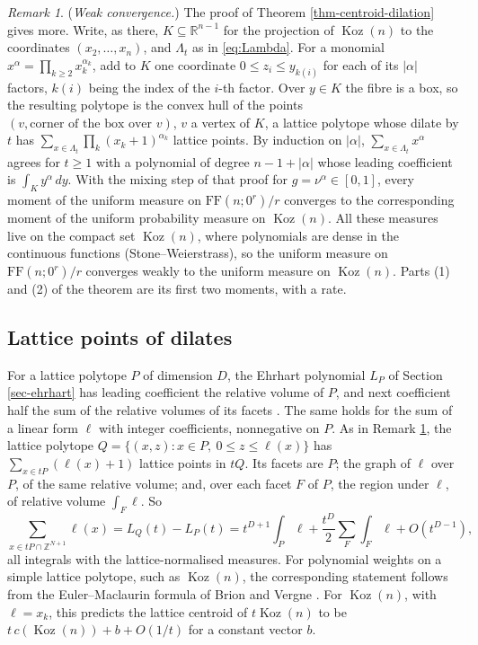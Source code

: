 \documentclass[11pt, a4paper, abstract=yes]{scrartcl}
\theoremstyle{definition}
\theoremstyle{remark}
\newtheorem{remark}[definition]{Remark}
\theoremstyle{plain}
\theoremstyle{remark}
\theoremstyle{plain}
\newcommand{\Koz}{\operatorname{Koz}}
\newcommand{\FF}{\mathrm{FF}}
\begin{document}
\begin{remark}
(\emph{Weak convergence.}) The proof of Theorem \ref{thm-centroid-dilation} gives more. Write, as there,
\(K\subseteq\mathbb R^{n-1}\) for the projection of \(\Koz(n)\) to the coordinates
\((x_2,\dots,x_n)\), and \(\Lambda_t\) as in \eqref{eq:Lambda}. For a monomial
\(x^\alpha=\prod_{k\ge2}x_k^{\alpha_k}\), add to \(K\) one coordinate \(0\le z_i\le y_{k(i)}\) for each of
its \(\lvert\alpha\rvert\) factors, \(k(i)\) being the index of the \(i\)-th factor. Over \(y\in K\) the
fibre is a box, so the resulting polytope is the
convex hull of the points \((v,\text{corner of the box over }v)\), \(v\) a vertex of \(K\), a lattice
polytope whose dilate by \(t\) has \(\sum_{x\in\Lambda_t}\prod_k(x_k+1)^{\alpha_k}\) lattice points. By
induction on \(\lvert\alpha\rvert\), \(\sum_{x\in\Lambda_t}x^\alpha\) agrees for \(t\ge1\) with a polynomial
of degree \(n-1+\lvert\alpha\rvert\) whose leading coefficient is \(\int_Ky^\alpha\,dy\). With the mixing
step of that proof for \(g=\nu^\alpha\in[0,1]\), every moment of the uniform measure on \(\FF(n;0^r)/r\) converges to
the corresponding moment of the uniform probability measure on \(\Koz(n)\). All these measures live on
the compact set \(\Koz(n)\), where polynomials are dense in the continuous functions
(Stone--Weierstrass), so the uniform measure on \(\FF(n;0^r)/r\) converges weakly to the uniform
measure on \(\Koz(n)\). Parts (1) and (2) of the theorem are its first two moments, with a rate.
\label{rem-weak-convergence}
\end{remark}
\subsection{Lattice points of dilates}
\label{sec:org4739b5f}

For a lattice polytope \(P\) of dimension \(D\), the Ehrhart polynomial \(L_P\) of
Section \ref{sec-ehrhart} has leading coefficient the relative volume of \(P\), and next coefficient
half the sum of the relative volumes of its facets \autocite[Theorem 5.6]{BeckRobins2015}. The same
holds for the sum of a linear form \(\ell\) with integer coefficients, nonnegative on \(P\). As in
Remark \ref{rem-weak-convergence}, the lattice polytope \(Q=\{(x,z):x\in P,\ 0\le z\le\ell(x)\}\) has
\(\sum_{x\in tP}(\ell(x)+1)\) lattice points in \(tQ\). Its facets are \(P\); the graph of \(\ell\)
over \(P\), of the same relative volume; and, over each facet \(F\) of \(P\), the region under
\(\ell\), of relative volume \(\int_F\ell\). So
\[
  \sum_{x\in tP\cap\mathbb Z^{N+1}}\ell(x)=L_Q(t)-L_P(t)
  =t^{D+1}\int_P\ell+\frac{t^D}2\sum_F\int_F\ell+O(t^{D-1}),
\]
all integrals with the lattice-normalised measures. For polynomial weights on a simple lattice
polytope, such as \(\Koz(n)\), the corresponding statement follows from the Euler--Maclaurin formula of Brion and Vergne
\autocite[Theorem 2.15]{BrionVergne1997}. For \(\Koz(n)\), with \(\ell=x_k\), this predicts the lattice
centroid of \(t\Koz(n)\) to be \(t\,c(\Koz(n))+b+O(1/t)\) for a constant vector \(b\).
\end{document}
